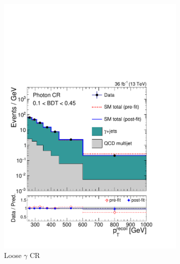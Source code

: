 \begin{figure}[]
\begin{center}
\begin{subfigure}[t]{0.24\textwidth}
            \includegraphics[width=\textwidth]{figures/monotop/postfit/stackedPostfit_photon_monotop_loose.pdf}
            \caption{Loose $\gamma$ CR}
        \end{subfigure}
        \begin{subfigure}[t]{0.24\textwidth}

\end{subfigure}
\end{center}
\end{figure}

